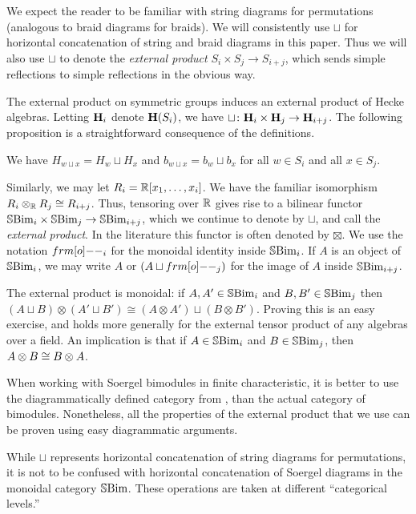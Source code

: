 We expect the reader to be familiar with string diagrams for permutations (analogous to braid diagrams for braids). We will consistently use $\sqcup$ for horizontal concatenation of
string and braid diagrams in this paper. Thus we will also use $\sqcup$ to denote the \emph{external product} $S_i \times S_j \to S_{i+j}$, which sends simple reflections to simple
reflections in the obvious way.

The external product on symmetric groups induces an external product of Hecke algebras. Letting ${\mathbf H}_i$ denote ${\mathbf H}(S_i)$, we have $\sqcup \colon {\mathbf H}_i \times {\mathbf H}_j \rightarrow {\mathbf H}_{i+j}$. The
following proposition is a straightforward consequence of the definitions.

\begin{proposition}
We have $H_{w\sqcup x} = H_w \sqcup H_x$ and $b_{w\sqcup x} = b_w\sqcup b_x$ for all $w\in S_i$ and all $x\in S_j$.
\end{proposition}


Similarly, we may let $R_i = {\mathbb{R}}[x_1,\ldots,x_i]$. We have the familiar isomorphism $R_i\otimes_{\mathbb{R}} R_j \cong R_{i+j}$. Thus, tensoring over ${\mathbb{R}}$ gives rise to a bilinear functor
${\mathbb{S}}{\rm Bim }_i \times {\mathbb{S}}{\rm Bim }_j \rightarrow {\mathbb{S}}{\rm Bim }_{i+j}$, which we continue to denote by $\sqcup$, and call the \emph{external product}. In the literature this functor is often denoted by
$\boxtimes$. We use the notation $\one_i$ for the monoidal identity inside ${\mathbb{S}}{\rm Bim }_i$. If $A$ is an object of ${\mathbb{S}}{\rm Bim }_i$, we may write $A$ or $(A \sqcup \one_j)$ for the image of $A$ inside ${\mathbb{S}}{\rm Bim }_{i+j}$.

The external product is monoidal: if $A,A'\in {\mathbb{S}}{\rm Bim }_i$ and $B,B'\in {\mathbb{S}}{\rm Bim }_j$ then $(A\sqcup B)\otimes (A'\sqcup B')\cong (A\otimes A')\sqcup (B\otimes B')$. Proving this is an easy
exercise, and holds more generally for the external tensor product of any algebras over a field. An implication is that if $A \in {\mathbb{S}}{\rm Bim }_i$ and $B \in {\mathbb{S}}{\rm Bim }_j$, then $A \otimes B \cong B \otimes
A$.

\begin{remark} When working with Soergel bimodules in finite characteristic, it is better to use the diagrammatically defined category from \cite{EWsoergelCalc}, than the actual category of bimodules. Nonetheless, all the properties of the external product that we use can be proven using easy diagrammatic arguments. \end{remark}

\begin{remark} While $\sqcup$ represents horizontal concatenation of string diagrams for permutations, it is not to be confused with horizontal concatenation of Soergel diagrams in the monoidal category ${\mathbb{S}}{\rm Bim }$. These operations are taken at different ``categorical levels.''\end{remark}


